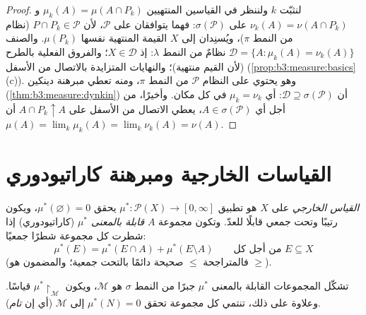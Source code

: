 \begin{proof}
لنثبّت $k$ ولننظر في القياسين المنتهيين $\mu_k(A) = \mu(A \cap
P_k)$ و $\nu_k(A) = \nu(A \cap P_k)$ على
$\sigma(\mathcal
P)$: فهما يتوافقان على $\mathcal P$، لأن $P \cap P_k \in \mathcal
P$ (نظام من
النمط $\pi$)، ويُسنِدان إلى $X$ القيمة المنتهية نفسها
$\mu(P_k)$. والصنف $\mathcal D = \{A : \mu_k(A) =
\nu_k(A)\}$ نظامٌ من النمط $\lambda$: إذ $X \in \mathcal D$؛
والفروق الفعلية بالطرح (لأن القيم منتهية)؛ والنهايات المتزايدة
بالاتصال من الأسفل (\cref{prop:b3:measure:basics}(c)). وهو يحتوي على النظام
$\mathcal P$ من النمط $\pi$، ومنه تعطي مبرهنة دينكين
(\cref{thm:b3:measure:dynkin}) أن $\mathcal D \supseteq
\sigma(\mathcal P)$: أي $\mu_k = \nu_k$ في كل مكان. وأخيرًا،
من أجل أي $A \in \sigma(\mathcal P)$، يعطي الاتصال من الأسفل على $A
\cap P_k \uparrow A$ أن $\mu(A) = \lim_k\mu_k(A) =
\lim_k\nu_k(A) = \nu(A)$.
\end{proof}

\section{القياسات الخارجية ومبرهنة كاراتيودوري}

\begin{definition}\label{def:b3:measure:outer}
\emph{القياس الخارجي} على $X$ هو تطبيق $\mu^* \colon \mathcal P(X) \to [0, \infty]$
يحقق $\mu^*(\varnothing) = 0$، ويكون رتيبًا وتحت جمعي قابلًا للعدّ. وتكون مجموعة $A$
\emph{قابلة  بالمعنى $\mu^*$} (كاراتيودوري) إذا شطرت كل
مجموعة شطرًا جمعيًا:
\[
\mu^*(E) = \mu^*(E \cap A) + \mu^*(E \setminus A)
\qquad \text{من أجل كل } E \subseteq X
\]
(فالمتراجحة $\leq$ صحيحة دائمًا بالتحت جمعية؛ والمضمون هو
$\geq$).
\end{definition}

\begin{theorem}[كاراتيودوري]\label{thm:b3:measure:caratheodory}
تشكّل المجموعات القابلة  بالمعنى $\mu^*$ جبرًا من النمط
$\sigma$ هو $\mathcal
M$، ويكون $\mu^*\restriction_{\mathcal M}$ قياسًا. وعلاوة على ذلك، تنتمي
كل مجموعة تحقق $\mu^*(N) = 0$ إلى $\mathcal M$ (أي إن 
\emph{تام}).
\end{theorem}


